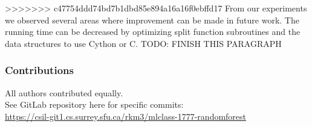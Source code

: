 \documentclass{article} %
\begin{document}
>>>>>>> c47754ddd74bd7b1dbd85e894a16a16f0ebffd17
From our experiments we observed several areas where improvement can be made in future work. The running time can be decreased by optimizing split function subroutines and the data structures to use Cython or C.
TODO: FINISH THIS PARAGRAPH

\subsubsection*{Contributions}
All authors contributed equally.\\
See GitLab repository here for specific commits:\\
\href{
    https://csil-git1.cs.surrey.sfu.ca/rkm3/mlclass-1777-randomforest
}{
    https://csil-git1.cs.surrey.sfu.ca/rkm3/mlclass-1777-randomforest
}


\small{


}
\end{document}
